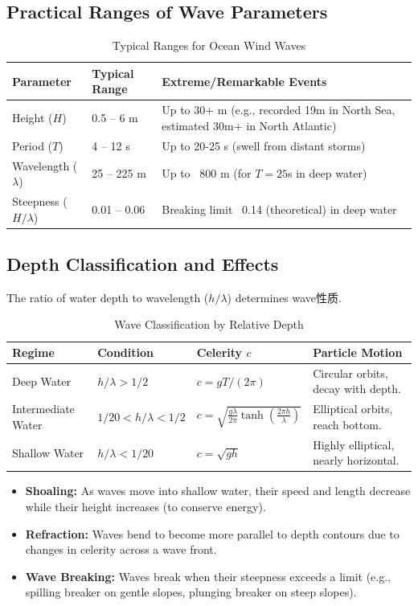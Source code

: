 \documentclass[11pt,letterpaper]{article}
\begin{document}
    \subsection{Practical Ranges of Wave Parameters}
    \begin{table}[H]
        \centering
        \caption{Typical Ranges for Ocean Wind Waves}
        \begin{tabular}{@{}lL{4cm}L{4cm}@{}}
            \toprule
            Parameter & Typical Range & Extreme/Remarkable Events \\
            \midrule
            Height ($H$) & 0.5 – 6 m & Up to 30+ m (e.g., recorded 19m in North Sea, estimated 30m+ in North Atlantic) \\
            Period ($T$) & 4 – 12 s & Up to 20-25 s (swell from distant storms) \\
            Wavelength ($\lambda$) & 25 – 225 m & Up to ~800 m (for $T=25$s in deep water) \\
            Steepness ($H/\lambda$) & 0.01 – 0.06 & Breaking limit ~0.14 (theoretical) in deep water \\
            \bottomrule
        \end{tabular}
    \end{table}

    \subsection{Depth Classification and Effects}
    The ratio of water depth to wavelength ($h/\lambda$) determines wave性质.
    \begin{table}[H]
        \centering
        \caption{Wave Classification by Relative Depth}
        \begin{tabular}{@{}llll@{}}
            \toprule
            Regime & Condition & Celerity $c$ & Particle Motion \\
            \midrule
            Deep Water & $h / \lambda > 1/2$ & $c = gT/(2\pi)$ & Circular orbits, decay with depth. \\
            Intermediate Water & $1/20 < h/\lambda < 1/2$ & $c = \sqrt{\frac{g\lambda}{2\pi} \tanh(\frac{2\pi h}{\lambda})}$ & Elliptical orbits, reach bottom. \\
            Shallow Water & $h / \lambda < 1/20$ & $c = \sqrt{gh}$ & Highly elliptical, nearly horizontal. \\
            \bottomrule
        \end{tabular}
    \end{table}
    \begin{itemize}
        \item \textbf{Shoaling:} As waves move into shallow water, their speed and length decrease while their height increases (to conserve energy).
        \item \textbf{Refraction:} Waves bend to become more parallel to depth contours due to changes in celerity across a wave front.
        \item \textbf{Wave Breaking:} Waves break when their steepness exceeds a limit (e.g., spilling breaker on gentle slopes, plunging breaker on steep slopes).
    \end{itemize}
\end{document}
